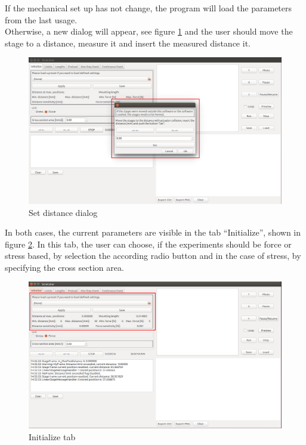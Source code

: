 If the mechanical set up has not change, the program will load the parameters from the last usage.
\\
Otherwise, a new dialog will appear, see figure \ref{fig:setdistance} and the user should move the stage to a distance, measure it and insert the measured distance it.

\begin{figure}[!ht]
	\centering
		\includegraphics[width=1.0\textwidth]{images/StartUp2}
	\caption{Set distance dialog}
	\label{fig:setdistance}
\end{figure}

In both cases, the current parameters are visible in the tab ``Initialize'', shown in figure \ref{fig:initialize}. In this tab, the user can choose, if the experiments should be force or stress based, by selection the according radio button and in the case of stress, by specifying the cross section area.

\begin{figure}[!ht]
	\centering
		\includegraphics[width=1.0\textwidth]{images/Initialize}
	\caption{Initialize tab}
	\label{fig:initialize}
\end{figure}

